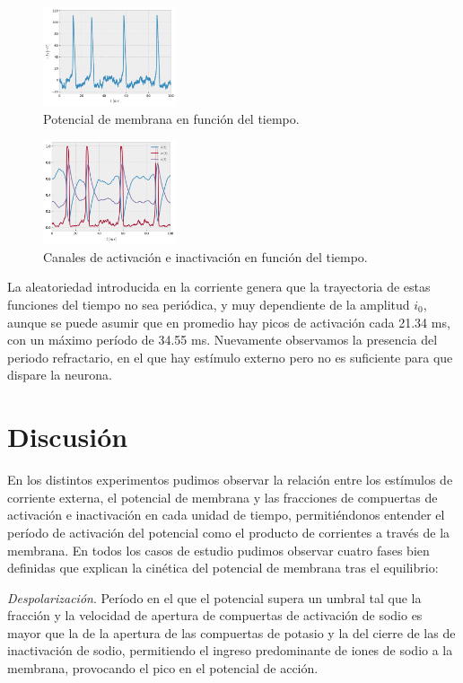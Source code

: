 \documentclass[aps,twocolumn,groupedaddress]{revtex4-2}
\begin{document}
\begin{figure}[ht]
    \centering
    \includegraphics[width=0.35\textwidth]{figs/ej7_potencial.png}
    \caption{Potencial de membrana en función del tiempo.} 
    \label{fig:ej7_potencial}
\end{figure}
\begin{figure}[ht]
    \centering
    \includegraphics[width=0.35\textwidth]{figs/ej7_canales.png}
    \caption{Canales de activación e inactivación en función del tiempo.} 
    \label{fig:ej7_canales}
\end{figure}

La aleatoriedad introducida en la corriente genera que la trayectoria de estas funciones del tiempo no sea periódica, y muy dependiente de la amplitud $i_0$, aunque se puede asumir que en promedio hay picos de activación cada 21.34 ms, con un máximo período de 34.55 ms. Nuevamente observamos la presencia del periodo refractario, en el que hay estímulo externo pero no es suficiente para que dispare la neurona. 

\section{Discusión}
En los distintos experimentos pudimos observar la relación entre los estímulos de corriente externa, el potencial de membrana y las fracciones de compuertas de activación e inactivación en cada unidad de tiempo, permitiéndonos entender el período de activación del potencial como el producto de corrientes a través de la membrana. En todos los casos de estudio pudimos observar cuatro fases bien definidas que explican la cinética del potencial de membrana tras el equilibrio:

\textit{Despolarización}. Período en el que el potencial supera un umbral tal que la fracción y la velocidad de apertura de compuertas de activación de sodio es mayor que la de la apertura de las compuertas de potasio y la del cierre de las de inactivación de sodio, permitiendo el ingreso predominante de iones de sodio a la membrana, provocando el pico en el potencial de acción.
\end{document}
